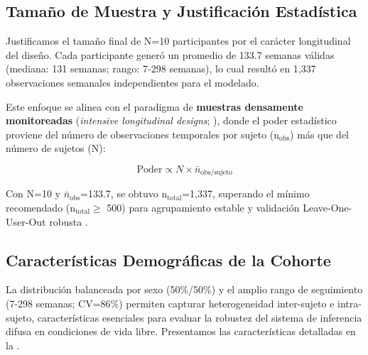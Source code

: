 \subsection{Tamaño de Muestra y Justificación Estadística}
\label{subsec:justificacion_n}

Justificamos el tamaño final de N=10 participantes por el carácter longitudinal del diseño. Cada participante generó un promedio de 133.7 semanas válidas (mediana: 131 semanas; rango: 7-298 semanas), lo cual resultó en 1,337 observaciones semanales independientes para el modelado.

Este enfoque se alinea con el paradigma de \textbf{muestras densamente monitoreadas} (\textit{intensive longitudinal designs}; \cite{Bolger2013}), donde el poder estadístico proviene del número de observaciones temporales por sujeto (n$_{\text{obs}}$) más que del número de sujetos (N):

\begin{equation}
\text{Poder} \propto N \times \bar{n}_{\text{obs/sujeto}}
\label{eq:poder_longitudinal}
\end{equation}

Con N=10 y $\bar{n}_{\text{obs}}$=133.7, se obtuvo n$_{\text{total}}$=1,337, superando el mínimo recomendado (n$_{\text{total}} \geq$ 500) para agrupamiento estable y validación Leave-One-User-Out robusta \cite{Alinia2020}.

\subsection{Características Demográficas de la Cohorte}
\label{subsec:caracteristicas_cohorte}

La distribución balanceada por sexo (50\%/50\%) y el amplio rango de seguimiento (7-298 semanas; CV=86\%) permiten capturar heterogeneidad inter-sujeto e intra-sujeto, características esenciales para evaluar la robustez del sistema de inferencia difusa en condiciones de vida libre. Presentamos las características detalladas en la .

